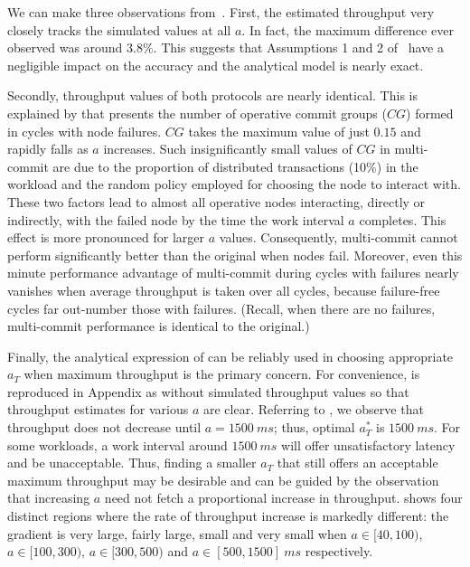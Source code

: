 We can make three observations from~. First, the estimated throughput very closely tracks the 
simulated values at all $a$. In fact, the maximum difference ever observed was around 3.8\%.
This suggests that Assumptions 1 and 2 of~ have a 
negligible impact on the accuracy and the analytical model is nearly exact. 

Secondly, throughput values of both protocols are nearly identical. This is explained by 
 that presents the number of operative commit groups ($CG$) formed in cycles with node failures. 
$CG$ takes the maximum value of just $0.15$ and rapidly falls as $a$ increases. Such insignificantly 
small values of $CG$ in multi-commit are due to the proportion of distributed transactions (10\%) in the 
workload and the random policy employed for choosing the node to interact with. These two factors lead to 
almost all operative nodes interacting, directly or indirectly, with the failed node by the time the work 
interval $a$ completes. This effect is more pronounced for larger $a$ values. Consequently, multi-commit 
cannot perform significantly better than the original when nodes fail. Moreover, even this minute performance 
advantage of multi-commit during cycles with failures nearly vanishes when average throughput is 
taken over all cycles, because failure-free cycles far out-number those with failures. (Recall, when 
there are no failures, multi-commit performance is identical to the original.)

Finally, the analytical expression of  can be reliably used in choosing 
appropriate $a_T$ when maximum throughput is the primary concern. For convenience,  is 
reproduced in Appendix as  without simulated throughput values so that throughput 
estimates for various $a$ are clear. Referring to , we observe that  throughput does not 
decrease until $a=1500~ms$; thus, optimal $a_{T}^*$ is $1500~ms$. For some workloads, a work interval around 
$1500~ms$ will offer unsatisfactory latency and be unacceptable. Thus, finding a smaller $a_T$ that still 
offers an acceptable maximum throughput may be desirable and can be guided by the observation that increasing 
$a$ need not fetch a proportional increase in throughput.  shows four distinct regions 
where the rate of throughput increase is markedly different: the gradient is very large, fairly large, small 
and very small when $a \in [40, 100)$, $a \in [100, 300)$, $a \in [300, 500)$ and $a \in [500, 1500] ~ms$  
respectively. 


